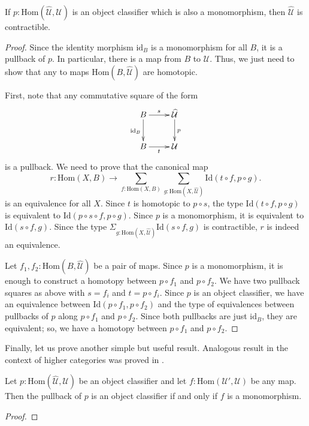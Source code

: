 \documentclass[reqno]{amsart}
\theoremstyle{definition}
\theoremstyle{remark}
\newcommand{\fs}[1]{\mathrm{#1}}
\newcommand{\Hom}{\fs{Hom}}
\newcommand{\Id}{\fs{Id}}
\newcommand{\id}{\fs{id}}
\numberwithin{figure}{section}
\begin{document}
\begin{prop}
If $p : \Hom(\widehat{\mathcal{U}},\mathcal{U})$ is an object classifier which is also a monomorphism, then $\widehat{\mathcal{U}}$ is contractible.
\end{prop}
\begin{proof}
Since the identity morphism $\id_B$ is a monomorphism for all $B$, it is a pullback of $p$.
In particular, there is a map from $B$ to $\widehat{\mathcal{U}}$.
Thus, we just need to show that any to maps $\Hom(B,\widehat{\mathcal{U}})$ are homotopic.

First, note that any commutative square of the form
\[ \xymatrix{ B \ar[r]^s \ar[d]_{\id_B} & \widehat{\mathcal{U}} \ar[d]^p \\
              B \ar[r]_t                & \mathcal{U}
            } \]
is a pullback.
We need to prove that the canonical map
\[ r : \Hom(X,B) \to \sum_{f : \Hom(X,B)} \sum_{g : \Hom(X,\widehat{\mathcal{U}})} \Id(t \circ f, p \circ g). \]
is an equivalence for all $X$.
Since $t$ is homotopic to $p \circ s$, the type $\Id(t \circ f, p \circ g)$ is equivalent to $\Id(p \circ s \circ f, p \circ g)$.
Since $p$ is a monomorphism, it is equivalent to $\Id(s \circ f, g)$.
Since the type $\Sigma_{g : \Hom(X,\widehat{\mathcal{U}})} \Id(s \circ f, g)$ is contractible, $r$ is indeed an equivalence.

Let $f_1,f_2 : \Hom(B,\widehat{\mathcal{U}})$ be a pair of maps.
Since $p$ is a monomorphism, it is enough to construct a homotopy between $p \circ f_1$ and $p \circ f_2$.
We have two pullback squares as above with $s = f_i$ and $t = p \circ f_i$.
Since $p$ is an object classifier, we have an equivalence between $\Id(p \circ f_1, p \circ f_2)$ and the type of equivalences between pullbacks of $p$ along $p \circ f_1$ and $p \circ f_2$.
Since both pullbacks are just $\id_B$, they are equivalent; so, we have a homotopy between $p \circ f_1$ and $p \circ f_2$.
\end{proof}

Finally, let us prove another simple but useful result.
Analogous result in the context of higher categories was proved in \cite[Theorem~3.28]{rasekh-eht}.

\begin{prop}
Let $p : \Hom(\widehat{\mathcal{U}},\mathcal{U})$ be an object classifier and let $f : \Hom(\mathcal{U}',\mathcal{U})$ be any map.
Then the pullback of $p$ is an object classifier if and only if $f$ is a monomorphism.
\end{prop}
\begin{proof}
\end{proof}
\end{document}
